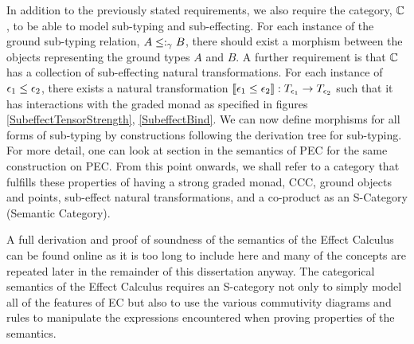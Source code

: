 \documentclass{Report}
\begin{document}
In addition to the previously stated requirements, we also require the category, $\mathbb{C}$, to be able to model sub-typing and sub-effecting. For each instance of the ground sub-typing relation, $A \leq:_\gamma B$, there should exist a morphism between the objects representing the ground types $A$ and $B$. A further requirement is that $\mathbb{C}$ has a collection of sub-effecting natural transformations. For each instance of $\epsilon_1 \leq \epsilon_2$, there exists a natural transformation ${\bf [\![}\epsilon_1\leq\epsilon_2{\bf ]\!]}: T_{\epsilon_1}{}\rightarrow T_{\epsilon_2}{}$ such that it has interactions with the graded monad as specified in figures \ref{SubeffectTensorStrength}, \ref{SubeffectBind}. We can now define morphisms for all forms of sub-typing by constructions following the derivation tree for sub-typing. For more detail, one can look at section  in the semantics of PEC for the same construction on PEC. From this point onwards, we shall refer to a category that fulfills these properties of having a strong graded monad, CCC, ground objects and points, sub-effect natural transformations, and a co-product as an S-Category (Semantic Category).


A full derivation and proof of soundness of the semantics of the Effect Calculus can be found online  as it is too long to include here and many of the concepts are repeated later in the remainder of this dissertation anyway. The categorical semantics of the Effect Calculus requires an S-category not only to simply model all of the features of EC but also to use the various commutivity diagrams and rules to manipulate the expressions encountered when proving properties of the semantics.
\end{document}
